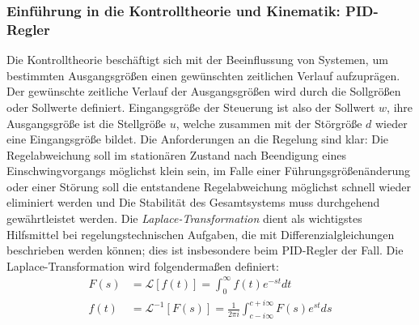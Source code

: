 \subsubsection{Einführung in die Kontrolltheorie und Kinematik: PID-Regler}
Die Kontrolltheorie beschäftigt sich mit der Beeinflussung von Systemen, um bestimmten
Ausgangsgrößen einen gewünschten zeitlichen Verlauf aufzuprägen\cite{regelungstechnik}.
Der gewünschte zeitliche Verlauf der Ausgangsgrößen wird durch die Sollgrößen oder Sollwerte
definiert. Eingangsgröße der Steuerung ist also der Sollwert $w$, ihre Ausgangsgröße ist die 
Stellgröße $u$, welche zusammen mit der Störgröße $d$ wieder eine Eingangsgröße bildet. Die 
Anforderungen an die Regelung sind klar: Die Regelabweichung soll im stationären Zustand
 nach Beendigung
eines Einschwingvorgangs möglichst klein sein, im Falle einer Führungsgrößenänderung oder einer
Störung soll die entstandene Regelabweichung möglichst schnell wieder eliminiert werden und
Die Stabilität des Gesamtsystems muss durchgehend gewährtleistet werden. 
Die \textit{Laplace-Transformation}\cite{regelungstechnik2} dient als wichtigstes Hilfsmittel
bei regelungstechnischen Aufgaben, die mit Differenzialgleichungen beschrieben werden können; dies
ist insbesondere beim PID-Regler der Fall. Die Laplace-Transformation wird folgendermaßen definiert:
\begin{align}
F(s) &= \mathcal{L}\left [f(t)\right ] = \int_{0}^{\infty}f(t)e^{-st}dt \\
f(t) &= \mathcal{L}^{-1}\left [F(s)\right ] = 
\frac{1}{2\pi i} \int_{c - i\infty}^{c+ i\infty} F(s)e^{st}ds
\end{align} 

